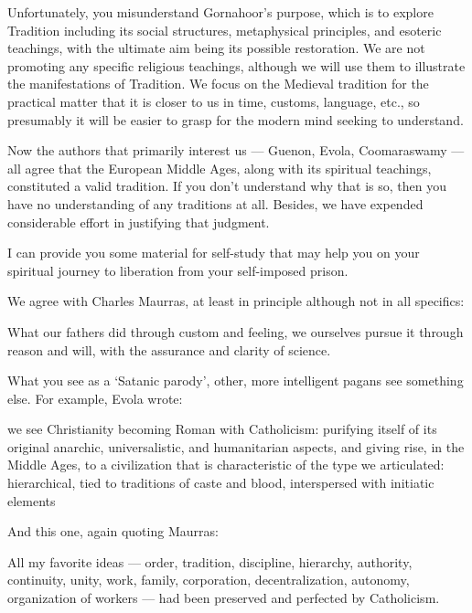 \begin{footnotesize}
\begin{sffamily}
Unfortunately, you misunderstand Gornahoor's purpose, which is to explore Tradition including its social
structures, metaphysical principles, and esoteric teachings, with the ultimate aim being its possible restoration. We
are not promoting any specific religious teachings, although we will use them to illustrate the manifestations of
Tradition. We focus on the Medieval tradition for the practical matter that it is closer to us in time, customs,
language, etc., so presumably it will be easier to grasp for the modern mind seeking to understand.

Now the authors that primarily interest us — Guenon, Evola, Coomaraswamy — all agree that the
European Middle Ages, along with its spiritual teachings, constituted a valid tradition. If you don't
understand why that is so, then you have no understanding of any traditions at all. Besides, we have expended
considerable effort in justifying that judgment.

I can provide you some material for self-study that may help you on your spiritual journey to liberation from your
self-imposed prison.

We agree with Charles Maurras, at least in principle although not in all specifics:

\begin{quotex}
What our fathers did through custom and feeling, we ourselves pursue it through reason and will, with the assurance and
clarity of science. 

\end{quotex}
What you see as a `Satanic parody’, other, more intelligent pagans see something else. For
example, Evola wrote:

\begin{quotex}
we see Christianity becoming Roman with Catholicism: purifying itself of its original anarchic, universalistic, and
humanitarian aspects, and giving rise, in the Middle Ages, to a civilization that is characteristic of the type we
articulated: hierarchical, tied to traditions of caste and blood, interspersed with initiatic elements 

\end{quotex}
And this one, again quoting Maurras:

\begin{quotex}
All my favorite ideas — order, tradition, discipline, hierarchy, authority, continuity, unity, work, family,
corporation, decentralization, autonomy, organization of workers — had been preserved and perfected by
Catholicism. 


\end{quotex}
\end{sffamily}
\end{footnotesize}
